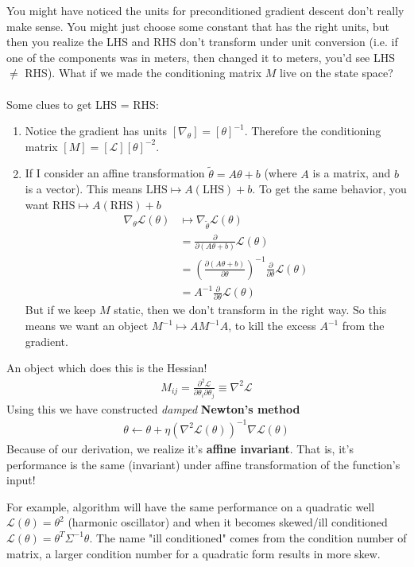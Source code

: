  You might have noticed the units for preconditioned gradient descent don't really make sense. You might just choose some constant that has the right units, but then you realize the LHS and RHS don't transform under unit conversion (i.e. if one of the components was in meters, then changed it to meters, you'd see LHS $\neq$ RHS). What if we made the conditioning matrix $M$ live on the state space?
\\
\\
Some clues to get LHS = RHS:
\begin{enumerate}
	\item Notice the gradient has units $[\nabla_\theta] = [\theta]^{-1}$. Therefore the conditioning matrix $[M] = [\mathcal L][\theta]^{-2}$. 
	\item If I consider an affine transformation $\tilde \theta = A \theta + b$ (where $A$ is a matrix, and $b$ is a vector). This means $\text{LHS} \mapsto A(\text{LHS}) + b$. To get the same behavior, you want $\text{RHS} \mapsto A(\text{RHS}) + b$
	\begin{align}
		\nabla_\theta \mathcal L(\theta) & \mapsto \nabla_{\tilde \theta} \mathcal L(\theta) \\
		& = \frac{\partial}{\partial (A \theta + b)} \mathcal L(\theta)\\
		& = \left(\frac{\partial (A \theta + b)	}{\partial \theta} \right)^{-1} \frac{\partial}{\partial \theta} \mathcal L(\theta)\\
		& = A^{-1} \frac{\partial }{\partial \theta} \mathcal L(\theta)
	\end{align}
	But if we keep $M$ static, then we don't transform in the right way. So this means we want an object $M^{-1} \mapsto A M^{-1} A$, to kill the excess $A^{-1}$ from the gradient.
\end{enumerate}
An object which does this is the Hessian!
\begin{align}
	M_{ij} = \frac{\partial^2 \mathcal L}{\partial \theta_i \partial \theta_j} \equiv \nabla^2 \mathcal L
\end{align}
Using this we have constructed \emph{damped} \textbf{Newton's method}
\begin{align}
	\theta \leftarrow \theta + \eta (\nabla^2 \mathcal L(\theta))^{-1} \nabla \mathcal L(\theta)
\end{align}
Because of our derivation, we realize it's \textbf{affine invariant}. That is, it's performance is the same (invariant) under affine transformation of the function's input! 

For example, algorithm will have the same performance on a quadratic well $\mathcal L(\theta) = \theta^2$ (harmonic oscillator) and when it becomes skewed/ill conditioned $\mathcal L(\theta) = \theta^T \Sigma^{-1} \theta$. The name "ill conditioned" comes from the condition number of matrix, a larger condition number for a quadratic form results in more skew. 

